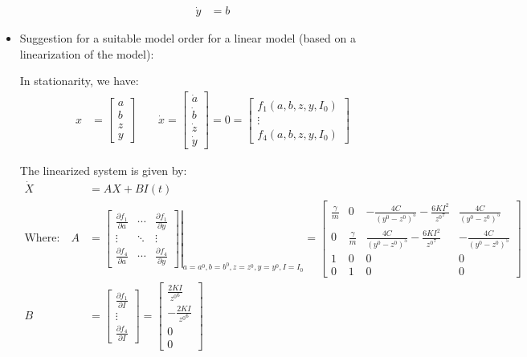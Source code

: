 \documentclass[10pt,a4paper]{article}
\begin{document}
\begin{itemize}
\begin{align*}
		\dot{y} &= b
	\end{align*}
	\item Suggestion for a suitable model order for a linear model (based on a linearization of the model):
	\par In stationarity, we have:
	\begin{align*}
		x &= \begin{bmatrix} a \\ b \\ z \\ y \end{bmatrix} \qquad \dot{x} = \begin{bmatrix} \dot{a} \\ \dot{b} \\ \dot{z} \\ \dot{y} \end{bmatrix} = 0 = \begin{bmatrix} f_{1}(a, b, z, y, I_{0}) \\ \vdots \\ f_{4}(a, b, z, y, I_{0}) \end{bmatrix}
	\end{align*}
	\par The linearized system is given by:
	\begin{align*}
		\dot{X} &= A X + B I(t) \\
		\text{Where:} \quad A &= \left. \begin{bmatrix} \frac{\partial f_{1}}{\partial a} & \cdots & \frac{\partial f_{1}}{\partial y} \\ \vdots & \ddots & \vdots \\ \frac{\partial f_{4}}{\partial a} & \cdots & \frac{\partial f_{4}}{\partial y} \end{bmatrix} \right|_{a = a^{0}, b = b^{0}, z = z^{0}, y = y^{0}, I = I_{0}} = \begin{bmatrix} \frac{\gamma}{m} & 0 & - \frac{4 C}{(y^{0} - z^{0})^{5}} - \frac{6 K I^{2}}{{z^{0}}^{7}} & \frac{4 C}{(y^{0} - z^{0})^{5}} \\ 0 & \frac{\gamma}{m} & \frac{4 C}{(y^{0} - z^{0})^{5}} - \frac{6 K I^{2}}{{z^{0}}^{7}} & - \frac{4 C}{(y^{0} - z^{0})^{5}} \\ 1 & 0 & 0 & 0 \\ 0 & 1 & 0 & 0 \end{bmatrix} \\ 
		B &= \begin{bmatrix} \frac{\partial f_{1}}{\partial I} \\ \vdots \\ \frac{\partial f_{4}}{\partial I} \end{bmatrix} = \begin{bmatrix} \frac{2 K I}{{z^{0}}^{6}} \\ - \frac{2 K I}{{z^{0}}^{6}} \\ 0 \\ 0 \end{bmatrix}

\end{align*}
\end{itemize}
\end{document}
